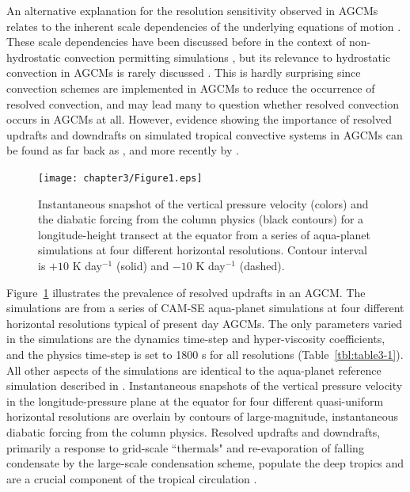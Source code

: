 An alternative explanation for the resolution sensitivity observed in AGCMs relates to the inherent scale dependencies of the underlying equations of motion \citep{F2007JAS,HR2017JCLIM}. These scale dependencies have been discussed before in the context of non-hydrostatic convection permitting simulations \citep{O1981JAS,WETAL1997MWR,PG2006JAS,JR2016QJRMS}, but its relevance to hydrostatic convection in AGCMs is rarely discussed \citep{F2007JAS,J2017JAMES}. This is hardly surprising since convection schemes are implemented in AGCMs to reduce the occurrence of resolved convection, and may lead many to question whether resolved convection occurs in AGCMs at all. However, evidence showing the importance of resolved updrafts and downdrafts on simulated tropical convective systems in AGCMs can be found as far back as \cite{MK1997QJRMS}, and more recently by \cite{OETAL2016JAMES}.

\begin{figure}[t]
\begin{center}
\noindent\texttt{[image: chapter3/Figure1.eps]}\\
\end{center}
\caption{Instantaneous snapshot of the vertical pressure velocity (colors) and the diabatic forcing from the column physics (black contours) for a longitude-height transect at the equator from a series of aqua-planet simulations at four different horizontal resolutions. Contour interval is $+10$ K day$^{-1}$ (solid) and $-10$ K day$^{-1}$ (dashed).}
\label{fig:figure3-1}
\end{figure}

Figure~\ref{fig:figure3-1} illustrates the prevalence of resolved updrafts in an AGCM. The simulations are from a series of CAM-SE aqua-planet simulations \citep[following][]{NH2000ASL} at four different horizontal resolutions typical of present day AGCMs. The only parameters varied in the simulations are the dynamics time-step and hyper-viscosity coefficients, and the physics time-step is set to 1800 s for all resolutions (Table~\ref{tbl:table3-1}). All other aspects of the simulations are identical to the aqua-planet reference simulation described in \cite{MWO2016JAMES}. Instantaneous snapshots of the vertical pressure velocity in the longitude-pressure plane at the equator for four different quasi-uniform horizontal resolutions are overlain by contours of large-magnitude, instantaneous diabatic forcing from the column physics. Resolved updrafts and downdrafts, primarily a response to grid-scale ``thermals" and re-evaporation of falling condensate by the large-scale condensation scheme, populate the deep tropics and are a crucial component of the tropical circulation \citep{HR2017JCLIM}. 

